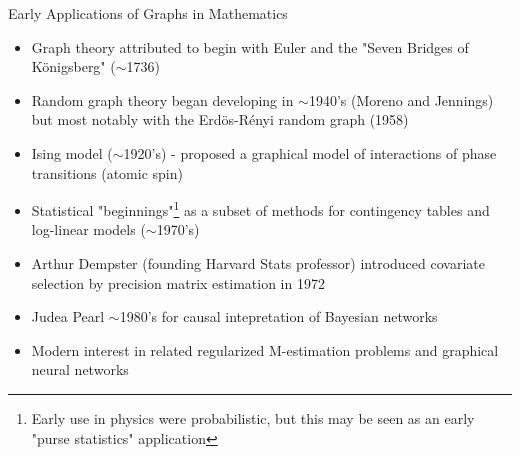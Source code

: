 \documentclass{beamer}
\begin{document}
\begin{frame}{Early Applications of Graphs in Mathematics}
    \begin{itemize}
        \item Graph theory attributed to begin with Euler and the "Seven Bridges of K\"onigsberg" ($\sim$1736)
        \item Random graph theory began developing in $\sim$1940's (Moreno and Jennings) but most notably with the Erd\"os-R\'enyi random graph (1958)
        \item Ising model ($\sim$1920's) - proposed a graphical model of interactions of phase transitions (atomic spin)
        \item Statistical "beginnings"\footnote{Early use in physics were probabilistic, but this may be seen as an early "purse statistics" application} as a subset of methods for contingency tables and log-linear models ($\sim$1970's)
        \item Arthur Dempster (founding Harvard Stats professor) introduced covariate selection by precision matrix estimation in 1972 \cite{dempster_covariance_1972}
        \item Judea Pearl $\sim$1980's for causal intepretation of Bayesian networks
        \item Modern interest in related regularized M-estimation problems and graphical neural networks 
    \end{itemize}
\end{frame}
\end{document}
